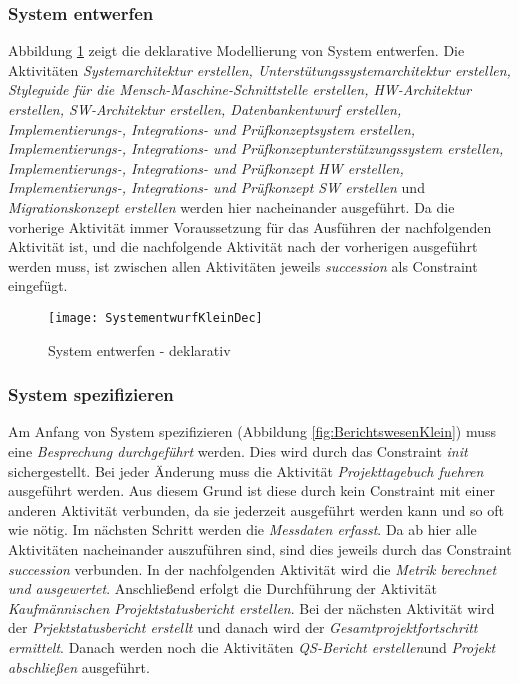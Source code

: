 \subsubsection{System entwerfen}


Abbildung \ref{fig:SystementwurfKleinDec} zeigt die deklarative Modellierung von System entwerfen.\newline
Die Aktivitäten \textit{Systemarchitektur erstellen, Unterstütungssystemarchitektur erstellen, Styleguide für die Mensch-Maschine-Schnittstelle erstellen, HW-Architektur erstellen, SW-Architektur erstellen, Datenbankentwurf erstellen, Implementierungs-, Integrations- und Prüfkonzeptsystem erstellen, Implementierungs-, Integrations- und Prüfkonzeptunterstützungssystem erstellen, Implementierungs-, Integrations- und Prüfkonzept HW erstellen, Implementierungs-, Integrations- und Prüfkonzept SW erstellen} und \textit{Migrationskonzept erstellen} werden hier nacheinander ausgeführt. Da die vorherige Aktivität immer Voraussetzung für das Ausführen der nachfolgenden Aktivität ist, und die nachfolgende Aktivität nach der vorherigen ausgeführt werden muss, ist zwischen allen Aktivitäten jeweils \textit{succession} als Constraint eingefügt.

\begin{figure}[!htbp]
\begin{center}
  \texttt{[image: SystementwurfKleinDec]} %
  \caption{System entwerfen - deklarativ}
  \label{fig:SystementwurfKleinDec}
\end{center}
\end{figure}

\subsubsection{System spezifizieren}


Am Anfang von System spezifizieren (Abbildung \ref{fig:BerichtswesenKlein}) muss eine \textit{Besprechung durchgeführt} werden. Dies wird durch das Constraint \textit{init} sichergestellt.\newline
Bei jeder Änderung muss die Aktivität \textit{Projekttagebuch fuehren} ausgeführt werden. Aus diesem Grund ist diese durch kein Constraint mit einer anderen Aktivität verbunden, da sie jederzeit ausgeführt werden kann und so oft wie nötig.\newline
Im nächsten Schritt werden die \textit{Messdaten erfasst}. Da ab hier alle Aktivitäten nacheinander auszuführen sind, sind dies jeweils durch das Constraint \textit{succession} verbunden.\newline
In der nachfolgenden Aktivität wird die \textit{Metrik berechnet und ausgewertet}.\newline
Anschließend erfolgt die Durchführung der Aktivität \textit{Kaufmännischen Projektstatusbericht erstellen}.\newline
Bei der nächsten Aktivität wird der \textit{Prjektstatusbericht erstellt} und danach wird der \textit{Gesamtprojektfortschritt ermittelt}.\newline
Danach werden noch die Aktivitäten \textit{QS-Bericht erstellen}und \textit{Projekt abschließen} ausgeführt.

